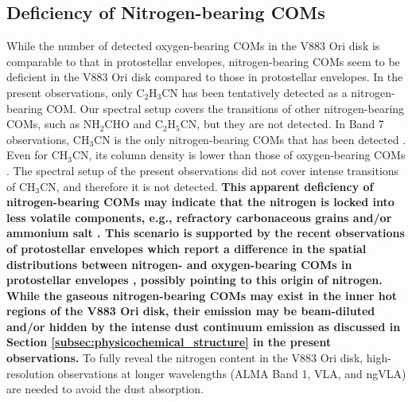 \documentclass[linenumbers, twocolumn, twocolappendix, astrosymb, times]{aastex631}
\begin{document}
\subsection{Deficiency of Nitrogen-bearing COMs}
While the number of detected oxygen-bearing COMs in the V883 Ori disk is comparable to that in protostellar envelopes, nitrogen-bearing COMs seem to be deficient in the V883 Ori disk compared to those in protostellar envelopes. In the present observations, 
only C$_2$H$_3$CN has been tentatively detected as a nitrogen-bearing COM. Our spectral setup covers the transitions of other nitrogen-bearing COMs, such as NH$_2$CHO and C$_2$H$_5$CN, but they are not detected. In Band 7 observations, CH$_3$CN is the only nitrogen-bearing COMs that has been detected \citep{Lee2019}. Even for CH$_3$CN, its column density is lower than those of oxygen-bearing COMs \citep{Lee2019}. The spectral setup of the present observations did not cover intense transitions of CH$_3$CN, and therefore it is not detected. \textbf{This apparent deficiency of nitrogen-bearing COMs may indicate that the nitrogen is locked into less volatile components, e.g., refractory carbonaceous grains \citep{vantHoff2020} and/or ammonium salt \citep{Poch2020, Altwegg2020}. This scenario is supported by the recent observations of protostellar envelopes which report a difference in the spatial distributions between nitrogen- and oxygen-bearing COMs in protostellar envelopes \citep{Nazari2023, Okoda2021, Okoda2022}, possibly pointing to this origin of nitrogen. While the gaseous nitrogen-bearing COMs may exist in the inner hot regions of the V883 Ori disk, their emission may be beam-diluted and/or hidden by the intense dust continuum emission as discussed in Section \ref{subsec:physicochemical_structure} in the present observations.} To fully reveal the nitrogen content in the V883 Ori disk, high-resolution observations at longer wavelengths (ALMA Band 1, VLA, and ngVLA) are needed to avoid the dust absorption.   
\end{document}
